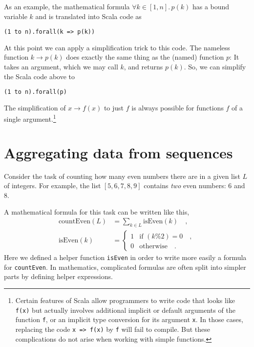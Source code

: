 As an example, the mathematical formula $\forall k\in\left[1,n\right].\,p\left(k\right)$
has a bound variable $k$ and is translated into Scala code as

\begin{lstlisting}
(1 to n).forall(k => p(k))
\end{lstlisting}
At this point we can apply a simplification trick to this code. The
nameless function $k\rightarrow p(k)$ does exactly the same thing
as the (named) function $p$: It takes an argument, which we may call
$k$, and returns $p(k)$. So, we can simplify the Scala code above
to

\begin{lstlisting}
(1 to n).forall(p)
\end{lstlisting}

The simplification of $x\rightarrow f(x)$ to just $f$ is always
possible for functions $f$ of a single argument.\footnote{Certain features of Scala allow programmers to write code that looks
like \lstinline!f(x)! but actually involves additional implicit or
default arguments of the function \lstinline!f!, or an implicit type
conversion for its argument \lstinline!x!. In those cases, replacing
the code \lstinline!x => f(x)! by \lstinline!f! will fail to compile.
But these complications do not arise when working with simple functions.}

\section{Aggregating data from sequences}

Consider the task of counting how many even numbers there are in a
given list $L$ of integers. For example, the list $\left[5,6,7,8,9\right]$
contains \emph{two} even numbers: $6$ and $8$.

A mathematical formula for this task can be written like this,
\begin{align*}
\text{countEven}\left(L\right) & =\sum_{k\in L}\text{isEven}\left(k\right)\quad,\\
\text{isEven}\left(k\right) & =\begin{cases}
1 & \text{if }(k\%2)=0\quad,\\
0 & \text{otherwise}\quad.
\end{cases}
\end{align*}
Here we defined a helper function \texttt{}\lstinline!isEven! in
order to write more easily a formula for \lstinline!countEven!. In
mathematics, complicated formulas are often split into simpler parts
by defining helper expressions. 

